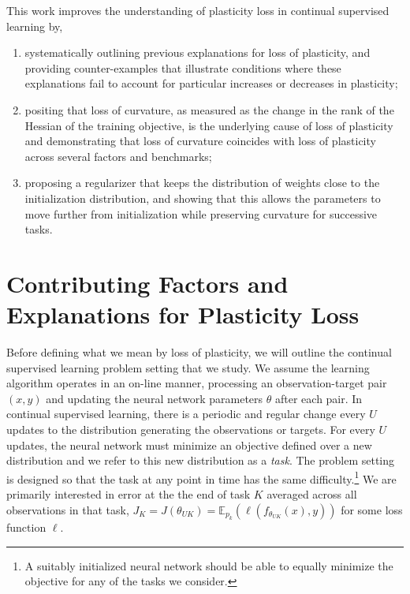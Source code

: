 \documentclass{article}
\begin{document}
This work improves the understanding of plasticity loss in continual supervised learning by,

\begin{enumerate}
  \item systematically outlining  previous explanations for loss of plasticity, and providing counter-examples that illustrate conditions where these explanations fail to account for particular increases or decreases in plasticity;
  \item positing that loss of curvature, as measured as the change in the rank of the Hessian of the training objective, is the underlying cause of loss of plasticity and demonstrating that loss of curvature coincides with loss of plasticity across several factors and benchmarks;
  \item proposing a regularizer that keeps the distribution of weights close to the initialization distribution, and showing that this allows the parameters to move further from initialization while preserving curvature 
  for successive tasks.
\end{enumerate}

\section{Contributing Factors and Explanations for Plasticity Loss}
\vspace{-2mm}
\label{sec:fac}

Before defining what we mean by loss of plasticity, we will outline the continual supervised learning problem setting that we study.
We assume  the  learning algorithm operates in an on-line manner, processing an observation-target pair $(x,y)$ and updating the neural network parameters $\theta$ after each pair.
In continual supervised learning, there is a periodic and regular change every $U$ updates to the distribution generating the observations or targets.
For every $U$ updates, the neural network must minimize an objective defined over a new distribution and we refer to this new distribution as a \textit{task}.
The problem setting is designed so that the task at any point in time has the same difficulty.\footnote{A suitably initialized neural network should be able to equally minimize the objective for any of the tasks we consider.}
We are primarily interested in error at the the end of task $K$ averaged across all observations in that task, $J_{K} = J(\theta_{UK}) = \mathbb{E}_{p_{k}}(\ell(f_{\theta_{UK}}(x), y))$ for some loss function $\ell$.
\end{document}
